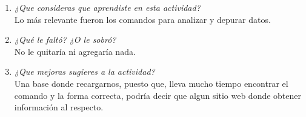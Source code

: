 \documentclass{article}
\begin{document}
\begin{doublespace}
\begin{itemize}
\begin{enumerate}
\item \textit{¿Que consideras que aprendiste en esta actividad?}
\\
Lo más relevante fueron los comandos para analizar y depurar datos.

\item \textit{¿Qué le faltó? ¿O le sobró?}
\\
No le quitaría ni agregaría nada.

\item \textit{¿Que mejoras sugieres a la actividad?}
\\
Una base donde recargarnos, puesto que, lleva mucho tiempo encontrar el comando y la forma correcta, podría decir que algun sitio web donde obtener información al respecto.
\end{enumerate}


\end{itemize}
\end{doublespace}
\end{document}
